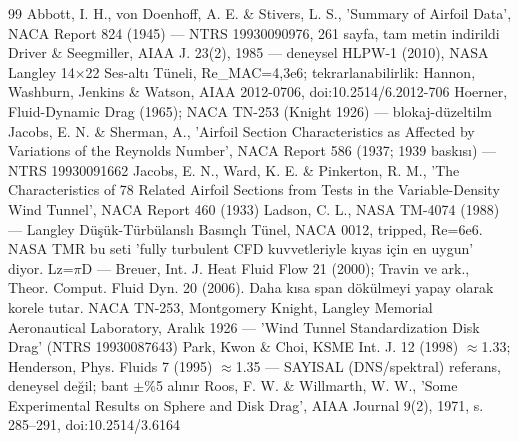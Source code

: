 \begin{thebibliography}{99}
 Abbott, I. H., von Doenhoff, A. E. \& Stivers, L. S., 'Summary of Airfoil Data', NACA Report 824 (1945) — NTRS 19930090976, 261 sayfa, tam metin indirildi
 Driver \& Seegmiller, AIAA J. 23(2), 1985 — deneysel
 HLPW-1 (2010), NASA Langley 14$\times$22 Ses-altı Tüneli, Re\_MAC=4,3e6; tekrarlanabilirlik: Hannon, Washburn, Jenkins \& Watson, AIAA 2012-0706, doi:10.2514/6.2012-706
 Hoerner, Fluid-Dynamic Drag (1965); NACA TN-253 (Knight 1926) — blokaj-düzeltilm
 Jacobs, E. N. \& Sherman, A., 'Airfoil Section Characteristics as Affected by Variations of the Reynolds Number', NACA Report 586 (1937; 1939 baskısı) — NTRS 19930091662
 Jacobs, E. N., Ward, K. E. \& Pinkerton, R. M., 'The Characteristics of 78 Related Airfoil Sections from Tests in the Variable-Density Wind Tunnel', NACA Report 460 (1933)
 Ladson, C. L., NASA TM-4074 (1988) — Langley Düşük-Türbülanslı Basınçlı Tünel, NACA 0012, tripped, Re=6e6. NASA TMR bu seti 'fully turbulent CFD kuvvetleriyle kıyas için en uygun' diyor.
 Lz=$\pi$D — Breuer, Int. J. Heat Fluid Flow 21 (2000); Travin ve ark., Theor. Comput. Fluid Dyn. 20 (2006). Daha kısa span dökülmeyi yapay olarak korele tutar.
 NACA TN-253, Montgomery Knight, Langley Memorial Aeronautical Laboratory, Aralık 1926 — 'Wind Tunnel Standardization Disk Drag' (NTRS 19930087643)
 Park, Kwon \& Choi, KSME Int. J. 12 (1998) $\approx$1.33; Henderson, Phys. Fluids 7 (1995) $\approx$1.35 — SAYISAL (DNS/spektral) referans, deneysel değil; bant $\pm$\%5 alınır
 Roos, F. W. \& Willmarth, W. W., 'Some Experimental Results on Sphere and Disk Drag', AIAA Journal 9(2), 1971, s. 285–291, doi:10.2514/3.6164

\end{thebibliography}
